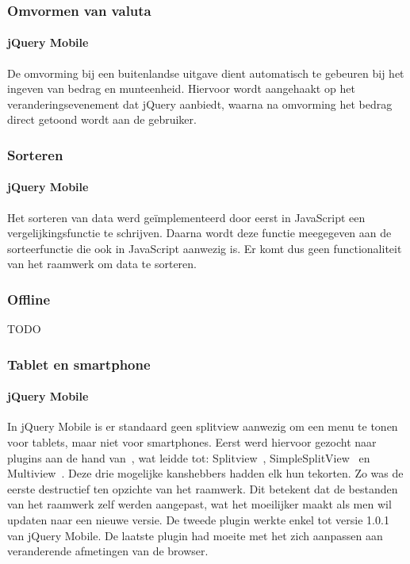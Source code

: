 \subsubsection{Omvormen van valuta}

\paragraph{jQuery Mobile} 
De omvorming bij een buitenlandse uitgave dient automatisch te gebeuren bij het ingeven van bedrag en munteenheid.
Hiervoor wordt aangehaakt op het veranderingsevenement  dat jQuery aanbiedt, waarna na omvorming het bedrag direct getoond wordt aan de gebruiker.

\subsubsection{Sorteren}

\paragraph{jQuery Mobile} 
Het sorteren van data werd geïmplementeerd door eerst in JavaScript een vergelijkingsfunctie te schrijven.
Daarna wordt deze functie meegegeven aan de sorteerfunctie die ook in JavaScript aanwezig is.
Er komt dus geen functionaliteit van het raamwerk om data te sorteren.

\subsubsection{Offline} 
TODO


\subsubsection{Tablet en smartphone}

\paragraph{jQuery Mobile} 
In jQuery Mobile is er standaard geen splitview aanwezig om een menu te tonen voor tablets, maar niet voor smartphones. 
Eerst werd hiervoor gezocht naar plugins aan de hand van~\cite{Deering2012}, wat leidde tot: Splitview~\cite{Rahman2013}, SimpleSplitView~\cite{Yared2013} en Multiview~\cite{Franck2012}. 
Deze drie mogelijke kanshebbers hadden elk hun tekorten. 
Zo was de eerste destructief ten opzichte van het raamwerk. 
Dit betekent dat de bestanden van het raamwerk zelf werden aangepast, wat het moeilijker maakt als men wil updaten naar een nieuwe versie. 
De tweede plugin werkte enkel tot versie 1.0.1 van jQuery Mobile. 
De laatste plugin had moeite met het zich aanpassen aan veranderende afmetingen van de browser. 

